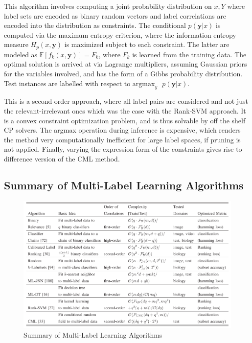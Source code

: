 \documentclass[12pt]{report}
\begin{document}
	 This algorithm involves computing a joint probability distribution on $x, Y$
   where label sets are encoded as binary random vectors and label correlations are encoded into the
   distribution as constraints.
   The conditional $p(\bm{y} | x)$ is computed via the maximum entropy
   criterion, where the information entropy measure $H_p(x,\bm{y})$ is maximized subject to each constraint.
   The latter are modeled as $ \mathbb{E} [ f_k(x,\bm{y}) ] = F_k  $, where $F_k$ is
 learned from the training data.
 The optimal solution is arrived at via Lagrange multipliers, assuming Gaussian
 priors for the variables involved, and has the form of a Gibbs probability
 distribution.
 Test instances are labelled with respect to $\text{argmax}_y\text{ }p(\bm{y} | x)$.


   This is a second-order approach, where all label pairs are considered and not
   just the relevant-irrelevant ones which was the case with the Rank-SVM approach. It is a
   convex constraint optimization problem, and is thus solvable by off the shelf
   CP solvers. The argmax operation during inference is expensive, which renders
   the method very computationally inefficient for large label spaces, if
   pruning is not applied. Finally, varying the expression form of the constraints gives rise to difference
   version of the CML method.
	 
	 \subsection*{Summary of Multi-Label Learning Algorithms}
	 
	 \begin{figure}[H]
	 	\centering
	 	\includegraphics[width=1\textwidth]{summary.png}
	 	\caption{Summary of Multi-Label Learning Algorithms}
	 	\centering
	 \end{figure}
 
\end{document}
